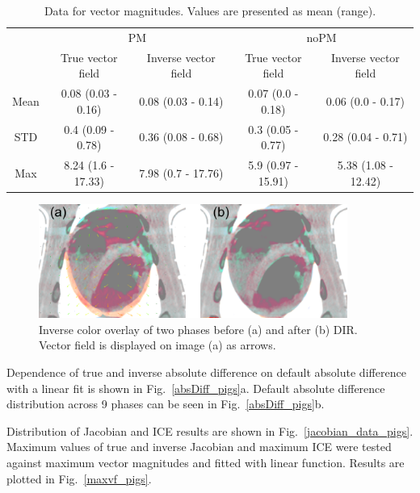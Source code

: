 \documentclass[type=dr, dr=rernat, accentcolor=tud7b,colorbacktitle, bigchapter, openright, twoside, 12pt ]{tudthesis}
\begin{document}
\begin{table}[H]
  \centering
  \caption{Data for vector magnitudes. Values are presented as mean (range).}
  \begin{tabular}{c|c|c|c|c}
	    & \multicolumn{2}{|c|}{PM} & \multicolumn{2}{|c}{noPM} \\
  
            & True vector field   & Inverse vector field   & True vector field  & Inverse vector field \\
       \hline
	Mean & 0.08 (0.03 - 0.16) & 0.08 (0.03 - 0.14) & 0.07 (0.0 - 0.18)  & 0.06 (0.0 - 0.17) \\ 
	STD  & 0.4 (0.09 - 0.78)  & 0.36 (0.08 - 0.68) & 0.3 (0.05 - 0.77)  & 0.28 (0.04 - 0.71) \\ 
	Max  & 8.24 (1.6 - 17.33) & 7.98 (0.7 - 17.76) & 5.9 (0.97 - 15.91) & 5.38 (1.08 - 12.42) \\ 
    \hline\hline
  \end{tabular}
  \label{tab:vectordata_pig}
\end{table}

\begin{figure}[H]
	\begin{center}		
		\includegraphics[width=0.9\textwidth]{./Images/exampleReg_pigs.png}
		\caption{Inverse color overlay of two phases before (a) and after (b) DIR. Vector field is displayed on image (a) as arrows.}
		\label{exampleReg_pigs}
	\end{center}
\end{figure}

Dependence of true and inverse absolute difference on default absolute difference with a linear fit is shown in Fig.~\ref{absDiff_pigs}a. 
Default absolute difference distribution across 9 phases can be seen in Fig.~\ref{absDiff_pigs}b.

Distribution of Jacobian and ICE results are shown in Fig.~\ref{jacobian_data_pigs}. Maximum values of true and inverse Jacobian and maximum ICE were
tested against maximum vector magnitudes and fitted with linear function. Results are plotted in Fig.~\ref{maxvf_pigs}.
\end{document}
